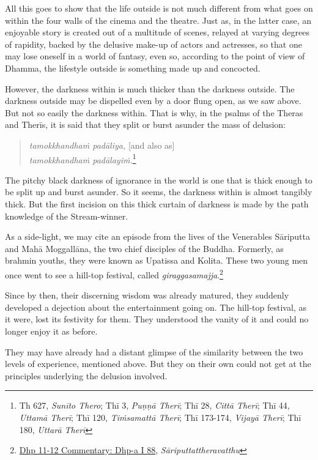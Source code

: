 All this goes to show that the life outside is not much different from what goes on within the four walls of the cinema and the theatre. Just as, in the latter case, an enjoyable story is created out of a multitude of scenes, relayed at varying degrees of rapidity, backed by the delusive make-up of actors and actresses, so that one may lose oneself in a world of fantasy, even so, according to the point of view of Dhamma, the lifestyle outside is something made up and concocted.

However, the darkness within is much thicker than the darkness outside. The darkness outside may be dispelled even by a door flung open, as we saw above. But not so easily the darkness within. That is why, in the psalms of the Theras and Therīs, it is said that they split or burst asunder the mass of delusion:

\begin{quote}
\emph{tamokkhandhaṁ padāliya,} [and also as]\\
\emph{tamokkhandhaṁ padālayiṁ.}\footnote{Th 627, \emph{Sunīto Thero}; Thī 3, \emph{Puṇṇā Therī}; Thī 28, \emph{Cittā Therī}; Thī 44, \emph{Uttamā Therī}; Thī 120, \emph{Tiṁsamattā Therī}; Thī 173-174, \emph{Vijayā Therī}; Thī 180, \emph{Uttarā Therī}}
\end{quote}

The pitchy black darkness of ignorance in the world is one that is thick enough to be split up and burst asunder. So it seems, the darkness within is almost tangibly thick. But the first incision on this thick curtain of darkness is made by the path knowledge of the Stream-winner.

As a side-light, we may cite an episode from the lives of the Venerables Sāriputta and Mahā Moggallāna, the two chief disciples of the Buddha. Formerly, as brahmin youths, they were known as Upatissa and Kolita. These two young men once went to see a hill-top festival, called \emph{giraggasamajja}.\footnote{\href{https://www.digitalpalireader.online/_dprhtml/index.html?loc=k.1.0.0.1.7.0.a&para=54&query=giraggasamajja}{Dhp 11-12 Commentary: Dhp-a I 88}, \emph{Sāriputtattheravatthu}}

Since by then, their discerning wisdom was already matured, they suddenly developed a dejection about the entertainment going on. The hill-top festival, as it were, lost its festivity for them. They understood the vanity of it and could no longer enjoy it as before.

They may have already had a distant glimpse of the similarity between the two levels of experience, mentioned above. But they on their own could not get at the principles underlying the delusion involved.

